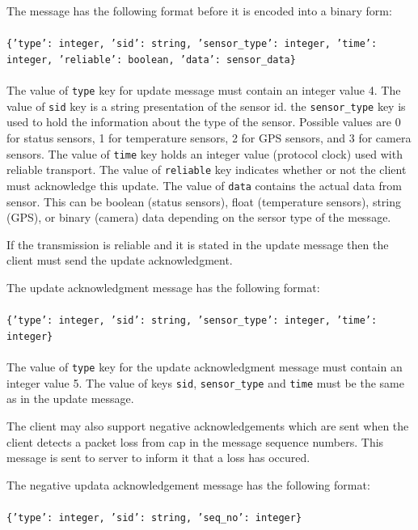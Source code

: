 The message has the following format before it is encoded into a binary form:
\\
\\
\texttt{\{'type': integer, 'sid': string, 'sensor\_type': integer, 'time':
integer, 'reliable': boolean, 'data': sensor\_data\}}
\\
\\
The value of \texttt{type} key for update message must contain an integer value
4. The value of \texttt{sid} key is a string presentation of the sensor id. the
\texttt{sensor\_type} key is used to hold the information about the type of the
sensor. Possible values are 0 for status sensors, 1 for temperature sensors, 2
for GPS sensors, and 3 for camera sensors. The value of \texttt{time} key holds
an integer value (protocol clock) used with reliable transport. The value of
\texttt{reliable} key indicates whether or not the client must acknowledge this
update. The value of \texttt{data} contains the actual data from sensor. This
can be boolean (status sensors), float (temperature sensors), string (GPS), or
binary (camera) data depending on the sersor type of the message.

If the transmission is reliable and it is stated in the update message then the
client must send the update acknowledgment.

The update acknowledgment message has the following format:
\\
\\
\texttt{\{'type': integer, 'sid': string, 'sensor\_type': integer, 'time': integer\}}
\\
\\

The value of \texttt{type} key for the update acknowledgment message must contain an integer value
5. The value of keys \texttt{sid}, \texttt{sensor\_type} and \texttt{time} must
be the same as in the update message.

The client may also support negative acknowledgements which are sent when the
client detects a packet loss from cap in the message sequence numbers. This
message is sent to server to inform it that a loss has occured.

The negative updata acknowledgement message has the following format:
\\
\\
\texttt{\{'type': integer, 'sid': string, 'seq\_no': integer\}}
\\
\\


